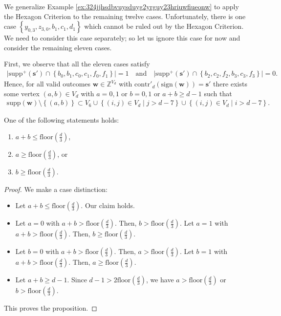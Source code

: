 We generalize Example \ref{ex:324jjhsdbvuysduyg2yrguy23hriuwfiueonw} to apply the Hexagon Criterion to the remaining twelve cases. Unfortunately, there is one case \(  \left\{ y_{0,3}, z_{3,0}, b_1, c_1, d_1 \right\}\) which cannot be ruled out by the Hexagon Criterion. We need to consider this case separately; so let us ignore this case for now and consider the remaining eleven cases.

First, we observe that all the eleven cases satisfy 
\begin{align*}
    \lvert \mathrm{supp}^+(\mathbf{s}') \cap \left\{b_0, b_1, c_0, c_1, f_0, f_1 \right\} \rvert = 1 \quad \text{and} \quad \lvert \mathrm{supp}^+(\mathbf{s}') \cap \left\{b_2, c_2, f_2, b_3, c_3, f_3 \right\} \rvert = 0.
\end{align*}
Hence, for all valid outcomes \( \mathbf{w} \in \mathbb{Z}^{V_d} \) with \( \mathrm{contr}'_d(\mathrm{sign}(\mathbf{w})) = \mathbf{s}' \) there exists some vertex \( (a,b) \in V_d \) with \( a = 0,1 \) or \( b=0,1 \) or \( a + b \geq d-1 \) such that 
\begin{align*}
    \mathrm{supp}(\mathbf{w}) \setminus \left\{ (a,b) \right\} \subset V_6 \cup \left\{ (i,j) \in V_d \mid j > d - 7 \right\}  \cup \left\{ (i,j) \in V_d \mid i > d - 7 \right\}.
\end{align*}

\begin{proposition}\label{prop:nkjeai32huh3i2}
    One of the following statements holds:
\begin{enumerate}
    \item \( a + b \leq \mathrm{floor}(\frac{d}{3}) \),
    \item \( a \geq \mathrm{floor}(\frac{d}{3}) \), or 
    \item \( b \geq \mathrm{floor}(\frac{d}{3}) \).
\end{enumerate}
\end{proposition}

\begin{proof}
    We make a case distinction: 
\begin{itemize}
    \item Let \( a + b \leq \mathrm{floor}(\frac{d}{3}) \). Our claim holds.
    \item Let \( a = 0 \) with \( a + b > \mathrm{floor}(\frac{d}{3}) \). Then, \( b > \mathrm{floor}(\frac{d}{3}) \). Let \( a = 1 \) with \( a + b > \mathrm{floor}(\frac{d}{3}) \). Then, \( b \geq \mathrm{floor}(\frac{d}{3}) \). 
    \item Let \( b = 0 \) with \( a + b > \mathrm{floor}(\frac{d}{3}) \). Then, \( a > \mathrm{floor}(\frac{d}{3}) \). Let \( b = 1 \) with \( a + b > \mathrm{floor}(\frac{d}{3}) \). Then, \( a \geq \mathrm{floor}(\frac{d}{3}) \). 
    \item Let \( a + b \geq d-1  \). Since \( d-1 > 2 \mathrm{floor}(\frac{d}{3}) \), we have \( a > \mathrm{floor}(\frac{d}{3}) \) or \( b > \mathrm{floor}(\frac{d}{3}) \).
\end{itemize}
This proves the proposition.
\end{proof}

